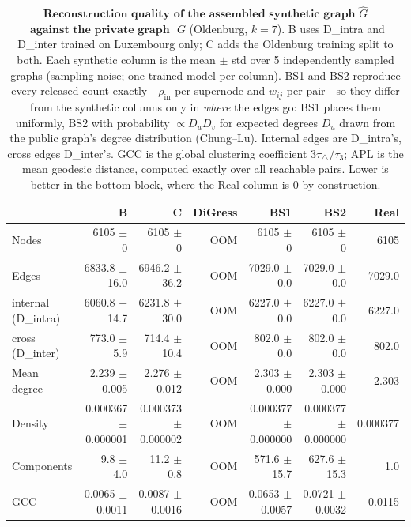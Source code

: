 \begin{table}[H]
\centering
\caption{$\textbf{Reconstruction quality of the assembled synthetic graph}$
$\widehat{G}$ $\textbf{ against the private graph }$ $G$ (Oldenburg, $k{=}7$).
B uses D\_intra and D\_inter trained on Luxembourg only; C adds the Oldenburg
training split to both. Each synthetic column is the mean $\pm$ std over 5
independently sampled graphs (sampling noise; one trained model per column).
BS1 and BS2 reproduce every released count exactly---$\rho_{\mathrm{in}}$
per supernode and $w_{ij}$ per pair---so they differ from the synthetic columns
only in \emph{where} the edges go: BS1 places them uniformly, BS2 with
probability $\propto D_uD_v$ for expected degrees $D_u$ drawn from the public
graph's degree distribution (Chung--Lu). Internal
edges are D\_intra's, cross edges D\_inter's. GCC is the global clustering
coefficient $3\tau_{\triangle}/\tau_{3}$; APL is the mean geodesic distance,
computed exactly over all reachable pairs. Lower is better in the bottom block,
where the Real column is $0$ by construction.}
\label{tab:lsyn-oldenburg-k7}
\begin{tabular}{lrrrrrr}
\toprule
 & B & C & DiGress & BS1 & BS2 & Real \\
\midrule
Nodes                         & 6105 $\pm$ 0 & 6105 $\pm$ 0 & OOM & 6105 $\pm$ 0 & 6105 $\pm$ 0 & 6105 \\
Edges                         & 6833.8 $\pm$ 16.0 & 6946.2 $\pm$ 36.2 & OOM & 7029.0 $\pm$ 0.0 & 7029.0 $\pm$ 0.0 & 7029.0 \\
\quad internal (D\_intra)     & 6060.8 $\pm$ 14.7 & 6231.8 $\pm$ 30.0 & OOM & 6227.0 $\pm$ 0.0 & 6227.0 $\pm$ 0.0 & 6227.0 \\
\quad cross (D\_inter)        & 773.0 $\pm$ 5.9 & 714.4 $\pm$ 10.4 & OOM & 802.0 $\pm$ 0.0 & 802.0 $\pm$ 0.0 & 802.0 \\
Mean degree                   & 2.239 $\pm$ 0.005 & 2.276 $\pm$ 0.012 & OOM & 2.303 $\pm$ 0.000 & 2.303 $\pm$ 0.000 & 2.303 \\
Density                       & 0.000367 $\pm$ 0.000001 & 0.000373 $\pm$ 0.000002 & OOM & 0.000377 $\pm$ 0.000000 & 0.000377 $\pm$ 0.000000 & 0.000377 \\
Components                    & 9.8 $\pm$ 4.0 & 11.2 $\pm$ 0.8 & OOM & 571.6 $\pm$ 15.7 & 627.6 $\pm$ 15.3 & 1.0 \\
GCC                           & 0.0065 $\pm$ 0.0011 & 0.0087 $\pm$ 0.0016 & OOM & 0.0653 $\pm$ 0.0057 & 0.0721 $\pm$ 0.0032 & 0.0115 \\

\end{tabular}
\end{table}

